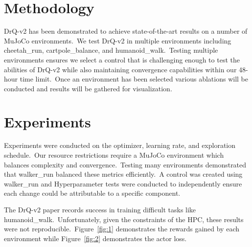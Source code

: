 \documentclass[conference]{./IEEEtran/IEEEtran} %
\begin{document}
    \section{Methodology}\label{sec:methodology}

    DrQ-v2 has been demonstrated to achieve state-of-the-art results on a number of MuJoCo environments.\ We test DrQ-v2 in multiple
    environments including cheetah\_run, cartpole\_balance, and humanoid\_walk.\ Testing multiple environments ensures we select a
    control that is challenging enough to test the abilities of DrQ-v2 while also maintaining convergence capabilities within
    our 48-hour time limit.\ Once an environment has been selected various ablations will be conducted and results will be
    gathered for visualization.\

    \section{Experiments}\label{sec:experiments}

    Experiments were conducted on the optimizer, learning rate, and exploration schedule.\ Our resource restrictions require a
    MuJoCo environment which balances complexity and convergence.\ Testing many environments demonstrated that walker\_run balanced
    these metrics efficiently.\ A control was created using walker\_run and Hyperparameter tests were conducted to independently
    ensure each change could be attributable to a specific component.\

    The DrQ-v2 paper records success in training difficult tasks like humanoid\_walk.\ Unfortunately, given the constraints of
    the HPC, these results were not reproducible.\ Figure~\ref{fig:1} demonstrates the rewards gained by each environment
    while Figure~\ref{fig:2} demonstrates the actor loss.
\end{document}
